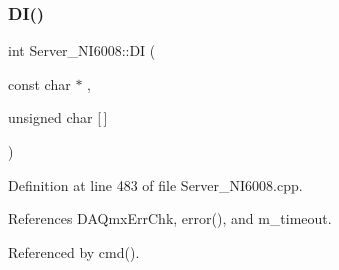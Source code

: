 \subsubsection{\texorpdfstring{D\+I()}{DI()}}
{\footnotesize\ttfamily int Server\+\_\+\+N\+I6008\+::\+DI (\begin{DoxyParamCaption}\item[{const char $\ast$}]{,  }\item[{unsigned char}]{\mbox{[}$\,$\mbox{]} }\end{DoxyParamCaption})}



Definition at line 483 of file Server\+\_\+\+N\+I6008.\+cpp.



References D\+A\+Qmx\+Err\+Chk, error(), and m\+\_\+timeout.



Referenced by cmd().


